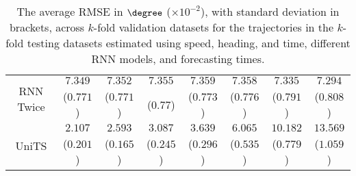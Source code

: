 \begin{table}[!ht]
{\begin{tabular}{|c|c|c|c|c|c|c|c|}
			\multirow{2}{*}{RNN Twice} & $7.349$ & $7.352$ & $7.355$ & $7.359$ & $7.358$ & $7.335$ & $7.294$ \\
			 & ($0.771$) & ($0.771$) & ($0.77$) & ($0.773$) & ($0.776$) & ($0.791$) & ($0.808$) \\ \hline
			\multirow{2}{*}{UniTS} & $2.107$ & $2.593$ & $3.087$ & $3.639$ & $6.065$ & $10.182$ & $13.569$ \\
			 & ($0.201$) & ($0.165$) & ($0.245$) & ($0.296$) & ($0.535$) & ($0.779$) & ($1.059$) \\ \hline
		\end{tabular}
	}
	\caption{The average RMSE in $\degree$ ($\times 10^{-2}$), with standard deviation in brackets, across $k$-fold validation datasets for the trajectories in the $k$-fold testing datasets estimated using speed, heading, and time, different RNN models, and forecasting times.}
	\label{tab:all_speed_actual_dir_RMSE}
\end{table}

